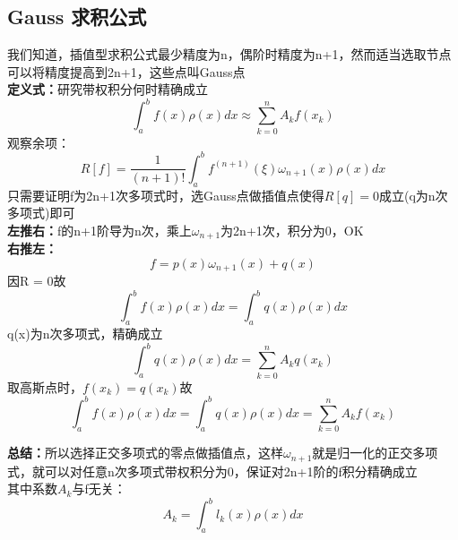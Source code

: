 \documentclass[12pt]{article}
\begin{document}
\begin{CJK*}{UTF8}{gbsn}
\begin{spacing}{1.5}
\subsection{Gauss 求积公式}
    我们知道，插值型求积公式最少精度为n，偶阶时精度为n+1，然而适当选取节点可以将精度提高到2n+1，这些点叫Gauss点\\
    \textbf{定义式：}研究带权积分何时精确成立
    $$
        \int_a^bf(x)\rho(x)dx \approx \sum_{k=0}^nA_kf(x_k) 
    $$
    观察余项：
    $$
        R[f] = \frac{1}{(n+1)!}\int_a^bf^{(n+1)}(\xi)\omega_{n+1}(x)\rho(x)dx
    $$
    只需要证明f为2n+1次多项式时，选Gauss点做插值点使得$R[q] = 0$成立(q为n次多项式)即可\\
    \textbf{左推右：}f的n+1阶导为n次，乘上$\omega_{n+1}$为2n+1次，积分为0，OK\\
    \textbf{右推左：}
    $$
        f = p(x)\omega_{n+1}(x) + q(x)
    $$
    因R = 0故
    $$
        \int_a^bf(x)\rho(x)dx = \int_a^bq(x)\rho(x)dx 
    $$
    q(x)为n次多项式，精确成立
    $$
        \int_a^bq(x)\rho(x)dx = \sum_{k=0}^nA_kq(x_k) 
    $$
    取高斯点时，$f(x_k) = q(x_k)$故
    $$
        \int_a^bf(x)\rho(x)dx = \int_a^bq(x)\rho(x)dx = \sum_{k=0}^nA_kf(x_k) 
    $$
    
    \textbf{总结：}所以选择正交多项式的零点做插值点，这样$\omega_{n+1}$就是归一化的正交多项式，就可以对任意n次多项式带权积分为0，保证对2n+1阶的f积分精确成立\\
    其中系数$A_k$与f无关：
    $$
        A_k = \int_a^bl_k(x)\rho(x)dx
    $$
    
    
\end{spacing}        
\end{CJK*}
\end{document}
